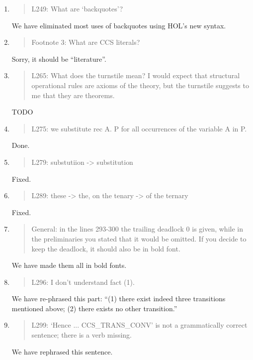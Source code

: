 \begin{enumerate}
\item \begin{quote}
    L249: What are ‘backquotes’?
  \end{quote}
  We have eliminated most uses of backquotes using HOL's new syntax.
  
\item \begin{quote}
    Footnote 3: What are CCS literals?
  \end{quote}
  Sorry, it should be ``literature''.
  
\item \begin{quote}
    L265: What does the turnstile mean? I would expect that structural
    operational rules are axioms of the theory, but the turnstile
    suggests to me that they are theorems.
  \end{quote}
  TODO
  
\item \begin{quote}
    L275: we substitute rec A. P for all occurrences of the variable A in P.
  \end{quote}
  Done.
  
\item \begin{quote}
    L279: substutiion -> substitution
  \end{quote}
  Fixed.
  
\item \begin{quote}
    L289: these -> the, on the tenary -> of the ternary
  \end{quote}
  Fixed.
  
\item \begin{quote}
    General: in the lines 293-300 the trailing deadlock 0 is given,
    while in the preliminaries you stated that it would be omitted. If
    you decide to keep the deadlock, it should also be in bold font.
  \end{quote}
  We have made them all in bold fonts.
  
\item \begin{quote}
    L296: I don’t understand fact (1).
  \end{quote}
We have re-phrased this part: ``(1) there exist indeed three
  transitions mentioned above; (2) there exists no other
  transition.''
  
\item \begin{quote}
    L299: ‘Hence ... CCS_TRANS_CONV’ is not a grammatically correct sentence; there is a verb missing.
  \end{quote}
  We have rephrased this sentence.


\end{enumerate}
